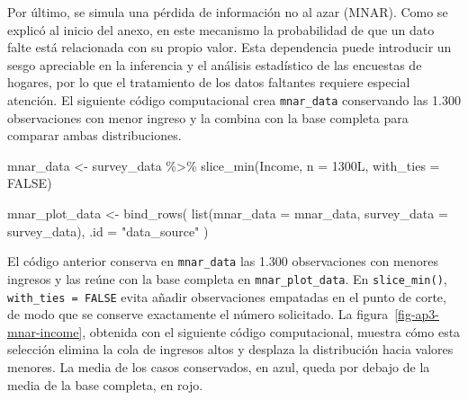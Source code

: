 \documentclass[
  spanish,
  11pt,
  letterpaper,
  oneside,
  open=any]{scrbook}
\newenvironment{Shaded}{\begin{snugshade}}{\end{snugshade}}
\newcommand{\AttributeTok}[1]{\textcolor[rgb]{0.40,0.45,0.13}{#1}}
\newcommand{\ConstantTok}[1]{\textcolor[rgb]{0.56,0.35,0.01}{#1}}
\newcommand{\DecValTok}[1]{\textcolor[rgb]{0.68,0.00,0.00}{#1}}
\newcommand{\FunctionTok}[1]{\textcolor[rgb]{0.28,0.35,0.67}{#1}}
\newcommand{\NormalTok}[1]{\textcolor[rgb]{0.00,0.23,0.31}{#1}}
\newcommand{\OtherTok}[1]{\textcolor[rgb]{0.00,0.23,0.31}{#1}}
\newcommand{\SpecialCharTok}[1]{\textcolor[rgb]{0.37,0.37,0.37}{#1}}
\newcommand{\StringTok}[1]{\textcolor[rgb]{0.13,0.47,0.30}{#1}}
\begin{document}
Por último, se simula una pérdida de información no al azar (MNAR). Como
se explicó al inicio del anexo, en este mecanismo la probabilidad de que
un dato falte está relacionada con su propio valor. Esta dependencia
puede introducir un sesgo apreciable en la inferencia y el análisis
estadístico de las encuestas de hogares, por lo que el tratamiento de
los datos faltantes requiere especial atención. El siguiente código
computacional crea \texttt{mnar\_data} conservando las 1.300
observaciones con menor ingreso y la combina con la base completa para
comparar ambas distribuciones.

\begin{Shaded}
\begin{Highlighting}[]
\NormalTok{mnar\_data }\OtherTok{\textless{}{-}}\NormalTok{ survey\_data }\SpecialCharTok{\%\textgreater{}\%}
  \FunctionTok{slice\_min}\NormalTok{(Income, }\AttributeTok{n =} \DecValTok{1300}\NormalTok{L, }\AttributeTok{with\_ties =} \ConstantTok{FALSE}\NormalTok{)}

\NormalTok{mnar\_plot\_data }\OtherTok{\textless{}{-}} \FunctionTok{bind\_rows}\NormalTok{(}
  \FunctionTok{list}\NormalTok{(}\AttributeTok{mnar\_data =}\NormalTok{ mnar\_data, }\AttributeTok{survey\_data =}\NormalTok{ survey\_data),}
  \AttributeTok{.id =} \StringTok{"data\_source"}
\NormalTok{)}
\end{Highlighting}
\end{Shaded}

El código anterior conserva en \texttt{mnar\_data} las 1.300
observaciones con menores ingresos y las reúne con la base completa en
\texttt{mnar\_plot\_data}. En \texttt{slice\_min()},
\texttt{with\_ties\ =\ FALSE} evita añadir observaciones empatadas en el
punto de corte, de modo que se conserve exactamente el número
solicitado. La figura~\ref{fig-ap3-mnar-income}, obtenida con el
siguiente código computacional, muestra cómo esta selección elimina la
cola de ingresos altos y desplaza la distribución hacia valores menores.
La media de los casos conservados, en azul, queda por debajo de la media
de la base completa, en rojo.
\end{document}
